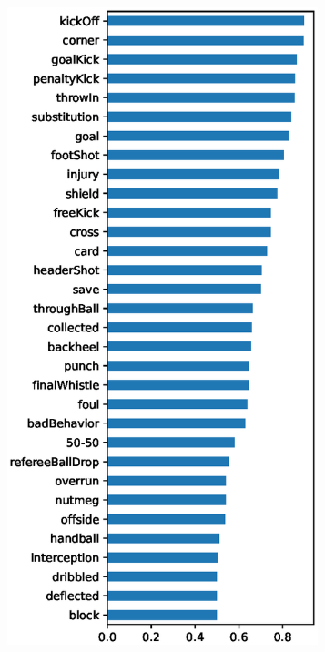 \begin{figure}
    \centering
    \begin{subfigure}{.24\textwidth}
        \centering
        \includegraphics[width=0.99\textwidth, keepaspectratio, interpolate]{img/07_ba_by_class_ph_2.eps}

\end{subfigure}
\end{figure}
